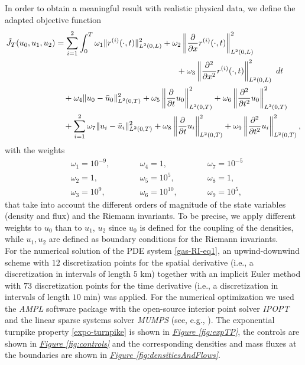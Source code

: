 \documentclass[12pt]{article}
\numberwithin{equation}{section}
\begin{document}
In order to 
obtain a meaningful result with realistic physical data, we define the adapted objective function
\begin{equation*}
	\begin{aligned}
		\tilde{J}_T(u_0, u_1, u_2) &= \sum_{i=1}^2\int_0^T  \omega_1\|r^{(i)}(\cdot,t)\|^2_{L^2(0,L)} + 
        \omega_2 \left\| \frac{\partial}{\partial x}	r^{(i)}(\cdot,t)\right\|^2_{L^2(0,L)} \\
		&\hspace{5.15cm}+ \omega_3 \left\| \frac{\partial^2}{\partial x^2} r^{(i)}(\cdot,t) \right\|^2_{L^2(0,L)}\ dt \\
		&\quad+ \omega_4 \|u_0-\bar{u}_0\|_{L^2(0,T)}^2 + \omega_5
        \left\| \frac{\partial}{\partial t} u_0 \right\|_{L^2(0,T)}^2 + \omega_6
        \left\| \frac{\partial^2}{\partial t^2} u_0 \right\|_{L^2(0,T)}^2 \\
		&\quad+ \sum_{i=1}^2 \omega_7\|u_i-\bar{u}_i\|_{L^2(0,T)}^2 + \omega_8
        \left\| \frac{\partial}{\partial t} u_i \right\|_{L^2(0,T)}^2 + \omega_9
        \left\| \frac{\partial^2}{\partial t^2} u_i \right\|_{L^2(0,T)}^2,
	\end{aligned}
\end{equation*}
with the weights 
\begin{equation*}
	\begin{aligned}
		&\omega_1 = 10^{-9}, & \qquad &\omega_4 = 1, & \qquad &\omega_7 = 10^{-5}\\
		&\omega_2 = 1, & &\omega_5 = 10^5, & &\omega_8 = 1,\\
		&\omega_3 = 10^9, & &\omega_6 = 10^{10}, & &\omega_9 = 10^5,
	\end{aligned}
\end{equation*}
that take into account the different orders of magnitude of
the state variables (density and flux) and the Riemann invariants.
%
To be precise, 
we apply different weights to $u_0$ than to $u_1$, $u_2$ since $u_0$ is defined for the coupling of the densities, while $u_1, u_2$ are defined as boundary conditions for the Riemann invariants. \\

For the numerical solution of the PDE system \eqref{gas-RI-eq1}, an upwind-downwind scheme with $12$ discretization points for the spatial derivative (i.e., a discretization in intervals of length $5$ km) together with an implicit Euler method with $73$ discretization points for the time derivative (i.e., a discretization in intervals of length $10$ min) was applied. For the numerical optimization we used the \textit{AMPL} software package with the open-source interior point solver \textit{IPOPT} and the linear sparse systems solver \textit{MUMPS} (see, e.g., \cite{ampl2002}). The exponential turnpike property \eqref{expo-turnpike} is shown in \hyperref[fig:expTP]{\textit{Figure \ref*{fig:expTP}}}, the controls are shown in \hyperref[fig:controls]{\textit{Figure \ref*{fig:controls}}} and the corresponding densities and mass fluxes at the boundaries are shown in \hyperref[fig:densitiesAndFlows]{\textit{Figure \ref*{fig:densitiesAndFlows}}}. 
\end{document}
